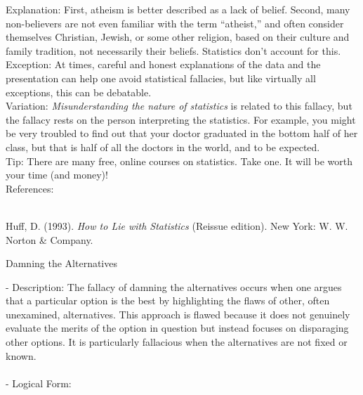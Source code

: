 \documentclass[a4paper,12pt,single,pdftex]{scrartcl}
\begin{document}
    
      Explanation: First, atheism is better described as a lack of belief.  Second, many non-believers are not even familiar with the term “atheist,” and often consider themselves Christian, Jewish, or some other religion, based on their culture and family tradition, not necessarily their beliefs.  Statistics don’t account for this.
    \\

    
      Exception: At times, careful and honest explanations of the data and the presentation can help one avoid statistical fallacies, but like virtually all exceptions, this can be debatable.
    \\

    
      Variation: {\it Misunderstanding the nature of statistics} is related to this fallacy, but the fallacy rests on the person interpreting the statistics.  For example, you might be very troubled to find out that your doctor graduated in the bottom half of her class, but that is half of all the doctors in the world, and to be expected.
    \\

    
      Tip: There are many free, online courses on statistics. Take one. It will be worth your time (and money)!
    \\

    References:

    
      
        
      \\

      
        
          Huff, D. (1993). {\it How to Lie with Statistics} (Reissue edition). New York: W. W. Norton \& Company.
        
      
    
  

Damning the Alternatives
    
      - Description: The fallacy of damning the alternatives occurs when one argues that a particular option is the best by highlighting the flaws of other, often unexamined, alternatives. This approach is flawed because it does not genuinely evaluate the merits of the option in question but instead focuses on disparaging other options. It is particularly fallacious when the alternatives are not fixed or known.
    \\

    
      
    \\

    
      - Logical Form:
    \\
\end{document}

